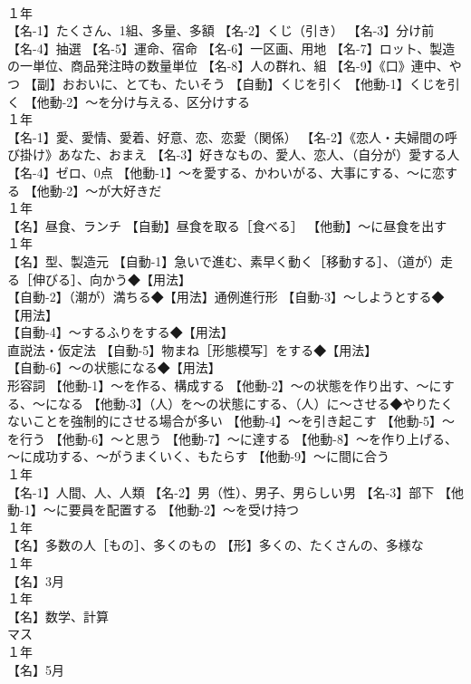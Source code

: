 \documentclass[8pt]{extreport}
\begin{document}
\begin{CJK}{UTF8}{min}
\\	１年	
\\	【名-1】たくさん、1組、多量、多額 【名-2】くじ（引き） 【名-3】分け前 【名-4】抽選 【名-5】運命、宿命 【名-6】一区画、用地 【名-7】ロット、製造の一単位、商品発注時の数量単位 【名-8】人の群れ、組 【名-9】《口》連中、やつ 【副】おおいに、とても、たいそう 【自動】くじを引く 【他動-1】くじを引く 【他動-2】～を分け与える、区分けする
\\	１年	
\\	【名-1】愛、愛情、愛着、好意、恋、恋愛（関係） 【名-2】《恋人・夫婦間の呼び掛け》あなた、おまえ 【名-3】好きなもの、愛人、恋人、（自分が）愛する人 【名-4】ゼロ、0点 【他動-1】～を愛する、かわいがる、大事にする、～に恋する 【他動-2】～が大好きだ
\\	１年	
\\	【名】昼食、ランチ 【自動】昼食を取る［食べる］ 【他動】～に昼食を出す
\\	１年	
\\	【名】型、製造元 【自動-1】急いで進む、素早く動く［移動する］、（道が）走る［伸びる］、向かう◆【用法】
\\	【自動-2】（潮が）満ちる◆【用法】通例進行形 【自動-3】～しようとする◆【用法】
\\	【自動-4】～するふりをする◆【用法】
\\	直説法・仮定法 【自動-5】物まね［形態模写］をする◆【用法】
\\	【自動-6】～の状態になる◆【用法】
\\	形容詞 【他動-1】～を作る、構成する 【他動-2】～の状態を作り出す、～にする、～になる 【他動-3】（人）を～の状態にする、（人）に～させる◆やりたくないことを強制的にさせる場合が多い 【他動-4】～を引き起こす 【他動-5】～を行う 【他動-6】～と思う 【他動-7】～に達する 【他動-8】～を作り上げる、～に成功する、～がうまくいく、もたらす 【他動-9】～に間に合う
\\	１年	
\\	【名-1】人間、人、人類 【名-2】男（性）、男子、男らしい男 【名-3】部下 【他動-1】～に要員を配置する 【他動-2】～を受け持つ
\\	１年	
\\	【名】多数の人［もの］、多くのもの 【形】多くの、たくさんの、多様な
\\	１年	
\\	【名】3月
\\	１年	
\\	【名】数学、計算 
\\	マス
\\	１年	
\\	【名】5月

\end{CJK}
\end{document}
